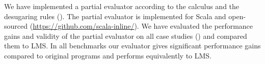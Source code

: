 We have implemented a partial evaluator according to the \calculus calculus and the desugaring rules (). The partial evaluator is implemented for Scala and open-sourced (\url{https://github.com/scala-inline/}). We have evaluated the performance gains and validity of the partial evaluator on all case studies () and compared them to LMS. In all benchmarks our evaluator gives significant performance gains compared to original programs and performs equivalently to LMS.
